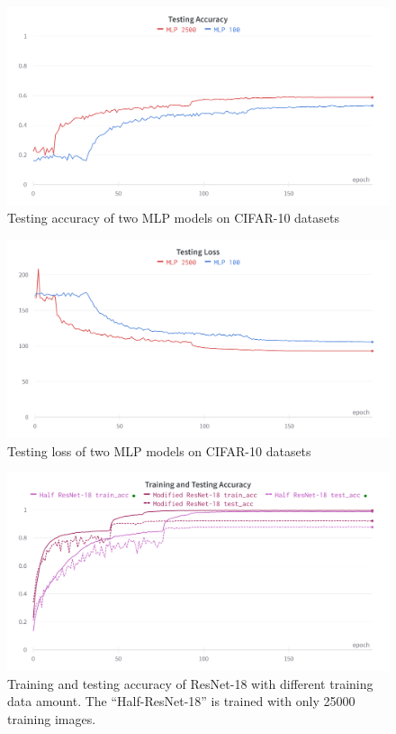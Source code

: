 \documentclass[twocolumn]{extarticle}
\begin{document}
\begin{appendices}
\begin{figure}[H]
\centering
\includegraphics[width=0.9\linewidth]{charts/mlp_cifar_10_test_acc}
\caption{Testing accuracy of two MLP models on CIFAR-10 datasets}
\label{chart: mlp_3}
\end{figure}

\begin{figure}[H]
\centering
\includegraphics[width=0.9\linewidth]{charts/mlp_cifar_10_test_loss}
\caption{Testing loss of two MLP models on CIFAR-10 datasets}
\label{chart: mlp_4}
\end{figure}


\begin{figure}[H]
\centering
\includegraphics[width=0.9\linewidth]{charts/resnet-half-cifar-acc}
\caption{Training and testing accuracy of ResNet-18 with different training data amount. The ``Half-ResNet-18'' is trained with only 25000 training images.}
\label{fig:resnet-half-cifar-acc}
\end{figure}


\end{appendices}
\end{document}
